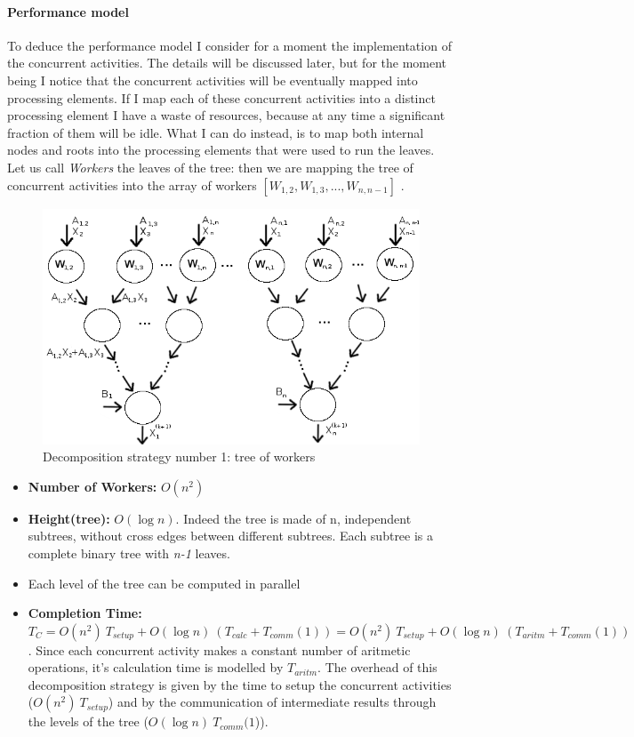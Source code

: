 \documentclass{article}
\begin{document}
\paragraph{Performance model} To deduce the performance model I consider for a moment the implementation of the concurrent activities. The details will be discussed later, but for the moment being I notice that the concurrent activities will be eventually mapped into processing elements. If I map each of these concurrent activities into a distinct processing element I have a waste of resources, because at any time a significant fraction of them will be idle. What I can do instead, is to map both internal nodes and roots into the processing elements that were used to run the leaves. Let us call \textit{Workers} the leaves of the tree: then we are mapping the tree of concurrent activities into the array of workers $[W_{1,2},W_{1,3}, ... ,W_{n,n-1}]$ . \\

\begin{figure}[h]
\centering
\includegraphics[scale=0.48]{tree_ca}
\caption{Decomposition strategy number 1: tree of workers}
\label{fig:tree_ca}
\end{figure} 

\begin{itemize}
\item \textbf{Number of Workers:} $O(n^2)$
\item \textbf{Height(tree):} $O(\log n)$. Indeed the tree is made of n, independent subtrees, without cross edges between different subtrees. Each subtree is a complete binary tree with \textit{n-1} leaves.
\item Each level of the tree can be computed in parallel
\item \textbf{Completion Time:} $T_{C} = O(n^2) \: T_{setup} + O( \log n) \: (T_{calc} + T_{comm}(1) ) = O(n^2) \: T_{setup} + O( \log n) \: (T_{aritm} + T_{comm}(1) )$. Since each concurrent activity makes a constant number of aritmetic operations, it's calculation time is modelled by $T_{aritm}$. The overhead of this decomposition strategy is given by the time to setup the concurrent activities ($O(n^2) \: T_{setup}$) and by the communication of intermediate results through the levels of the tree ($O( \log n) \: T_{comm}(1$)).
\end{itemize}
\end{document}
